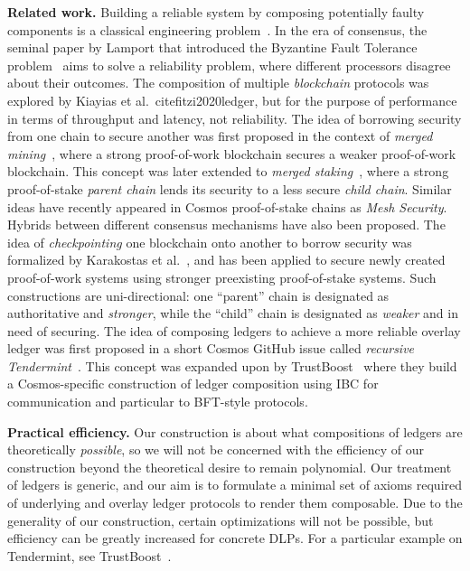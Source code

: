 \noindent
\textbf{Related work.} Building a reliable system by composing potentially faulty components
is a classical engineering problem~\cite{von1956probabilistic,moore1956reliable}.
In the era of consensus, the seminal
paper by Lamport that introduced the Byzantine Fault Tolerance problem~\cite{shostak1982byzantine}
aims to solve a reliability problem, where different processors disagree about their
outcomes. The composition of multiple \emph{blockchain} protocols was explored by
Kiayias et al.~cite{fitzi2020ledger}, but for the purpose of performance in terms of throughput
and latency, not reliability. The idea of borrowing security from one chain to
secure another was first proposed in the context of \emph{merged mining}~\cite{namecoin}, where
a strong proof-of-work blockchain secures a weaker proof-of-work blockchain. This
concept was later extended to \emph{merged staking}~\cite{pos-sidechains}, where a
strong proof-of-stake \emph{parent chain} lends its security to a less secure
\emph{child chain}. Similar ideas have recently appeared in Cosmos proof-of-stake
chains as \emph{Mesh Security}. Hybrids between different consensus mechanisms
have also been proposed. The idea of \emph{checkpointing}
one blockchain onto another to borrow security was formalized by Karakostas et al.~\cite{karakostas2021securing},
and has been applied to secure newly created proof-of-work systems using stronger
preexisting proof-of-stake systems. Such constructions are uni-directional:
one ``parent'' chain is designated as authoritative and \emph{stronger},
while the ``child'' chain is designated as \emph{weaker} and in need of securing.
The idea of composing ledgers to achieve a more reliable overlay ledger
was first proposed in a short Cosmos GitHub issue called
\emph{recursive Tendermint}~\cite{recursive-tendermint}.
This concept was expanded upon by TrustBoost~\cite{trustboost}
where they build a Cosmos-specific construction of ledger composition
using IBC for communication and particular to BFT-style protocols.

\noindent
\textbf{Practical efficiency.}
Our construction is about what compositions of ledgers are theoretically \emph{possible},
so we will not be concerned with the efficiency of our construction beyond the
theoretical desire to remain polynomial. Our treatment of
ledgers is generic, and our aim is to formulate a minimal set of axioms
required of underlying and overlay ledger protocols to render them composable.
Due to the generality of our construction, certain optimizations will not be
possible, but efficiency can be greatly increased for concrete DLPs.
For a particular example on Tendermint, see TrustBoost~\cite{trustboost}.

